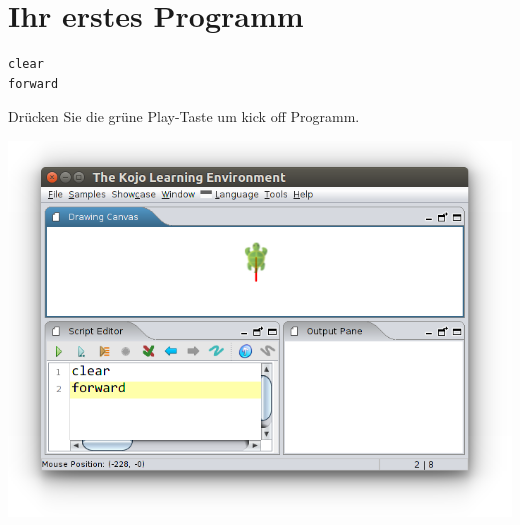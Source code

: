 \chapter{Ihr erstes Programm}
\begin{multicols}{2}

\begin{lstlisting}[basicstyle={\ttfamily\fontsize{36.0}{36.0}\selectfont}]
clear
forward
\end{lstlisting}
        
Drücken Sie die grüne Play-Taste um kick off Programm.

\columnbreak

\begin{center}
\includegraphics[width=14.0cm]{../img/forward.png}
\end{center}

\end{multicols}

